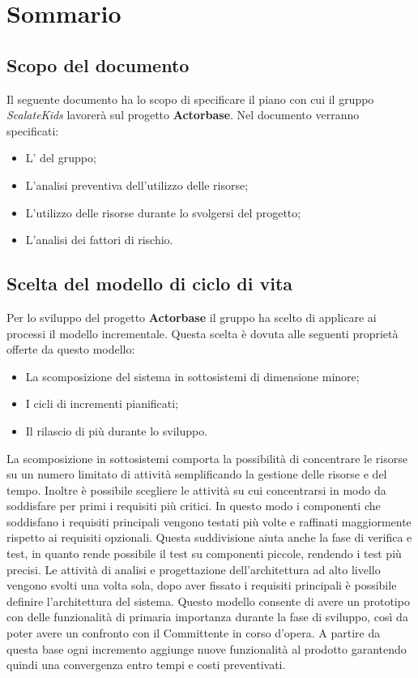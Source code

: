 \documentclass{scalatekids-article}
\begin{document}
\section{Sommario}
\subsection{Scopo del documento}
Il seguente documento ha lo scopo di specificare il piano con cui il gruppo \textit{ScalateKids} lavorerà sul progetto \textbf{Actorbase}.
Nel documento verranno specificati:
\prodPurpose
\glossExpl
\begin{itemize}
\item {L' del gruppo;}
\item {L'analisi preventiva dell'utilizzo delle risorse;}
\item {L'utilizzo delle risorse durante lo svolgersi del progetto;}
\item {L'analisi dei fattori di rischio.}
\end{itemize}
\subsection{Scelta del modello di ciclo di vita}
Per lo sviluppo del progetto \textbf{Actorbase} il gruppo ha scelto di applicare ai processi il modello incrementale. Questa scelta è dovuta alle seguenti proprietà offerte da questo modello:
\begin{itemize}
\item {La scomposizione del sistema in sottosistemi di dimensione minore;}
\item {I cicli di incrementi pianificati;}
\item {Il rilascio di più  durante lo sviluppo.}
\end{itemize}
La scomposizione in sottosistemi comporta la possibilità di concentrare le risorse su un numero limitato di attività semplificando la gestione delle risorse e del tempo. Inoltre è possibile scegliere le attività su cui concentrarsi in modo da soddisfare per primi i requisiti più critici. In questo modo i componenti che soddisfano i requisiti principali vengono testati più volte e raffinati maggiormente rispetto ai requisiti opzionali. Questa suddivisione aiuta anche la fase di verifica e test, in quanto rende possibile il test su componenti piccole, rendendo i test più precisi. Le attività di analisi e progettazione dell'architettura ad alto livello vengono svolti una volta sola, dopo aver fissato i requisiti principali è possibile definire l'architettura del sistema. Questo modello consente di avere un prototipo con delle funzionalità di primaria importanza durante la fase di sviluppo, così da poter avere un confronto con il Committente in corso d'opera. A partire da questa base ogni incremento aggiunge nuove funzionalità al prodotto garantendo quindi una convergenza entro tempi e costi preventivati.
\end{document}
